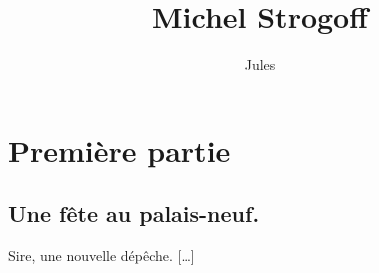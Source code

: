\documentclass[a4paper, 11pt]{book}
\begin{document}
\title{Michel Strogoff}
\author{Jules }
\date{} 

\maketitle

 

\part*{Première partie}


\chapter{Une fête au palais-neuf.}

\og Sire, une nouvelle dépêche.
[…]

\tableofcontents
\end{document}
